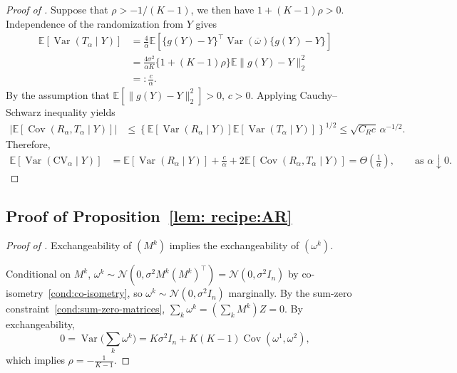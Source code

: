 \documentclass[12pt]{article}
\DeclareMathOperator{\Var}{Var}
\def\E{\mathbb{E}}
\def\calN{\mathcal{N}}
\newcommand{\tran}{^\intercal}
\theoremstyle{general}
\newcommand{\cv}{{\mathrm{CV}}}
\begin{document}
\begin{proof}[Proof of ]
Suppose that
$\rho>-1/(K-1)$, we then have
$1+(K-1)\rho>0$. Independence of the randomization from $Y$ gives
\begin{align*}
\mathbb E\!\left[
\operatorname{Var}(T_\alpha\mid Y)
\right]
&=
\frac{4}{\alpha}
\mathbb E\!\left[
\{g(Y)-Y\}\tran
\operatorname{Var}(\overline\omega)
\{g(Y)-Y\}
\right]\\
&=
\frac{4\sigma^2}{\alpha K}
\{1+(K-1)\rho\}
\mathbb E\|g(Y)-Y\|_2^2\\
&=:\frac{c}{\alpha}.
\end{align*}
By the assumption that $\E[\|g(Y)- Y\|_2^2 ]>0$, $c>0$.
Applying Cauchy--Schwarz inequality yields
\begin{align*}
\left|
\mathbb E\!\left[
\operatorname{Cov}(R_\alpha,T_\alpha\mid Y)
\right]
\right|
&\leq
\left\{
\mathbb E\!\left[
\operatorname{Var}(R_\alpha\mid Y)
\right]
\mathbb E\!\left[
\operatorname{Var}(T_\alpha\mid Y)
\right]
\right\}^{1/2}\leq
\sqrt{C_Rc}\,\alpha^{-1/2}.
\end{align*}
Therefore,
\begin{align*}
\mathbb E\!\left[
\operatorname{Var}(\cv_\alpha\mid Y)
\right]
&=
\mathbb E\!\left[
\operatorname{Var}(R_\alpha\mid Y)
\right]
+
\frac{c}{\alpha}
+
2\mathbb E\!\left[
\operatorname{Cov}(R_\alpha,T_\alpha\mid Y)
\right]=\Theta(\frac{1}{\alpha}),\qquad \text{as }\alpha\downarrow0.
\end{align*}

\end{proof}



\subsection{Proof of Proposition~\ref{lem: recipe:AR}}
\label{prf:lem:recipe:AR}

\begin{proof}[Proof of ]

Exchangeability of $(M^k)$ implies the exchangeability of $(\omega^k)$.

Conditional on $M^k$, $\omega^k \sim \calN(0, \sigma^2 M^k(M^k)^\top) = \calN(0, \sigma^2 I_n)$ by co-isometry~\ref{cond:co-isometry}, so $\omega^k \sim \calN(0, \sigma^2 I_n)$ marginally. By the sum-zero constraint~\ref{cond:sum-zero-matrices}, $\sum_k \omega^k = (\sum_k M^k) Z = 0$. By exchangeability,
$$
0=\Var\Big(\sum_k\omega^k\Big)=K\sigma^2I_n+K(K-1)\operatorname{Cov}(\omega^1,\omega^2),
$$
which implies $\rho = - \frac{1}{K-1}$.
\end{proof}
\end{document}
